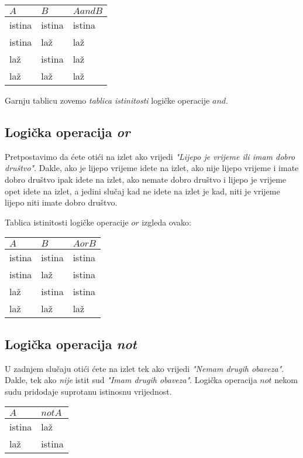 \begin{tabular}{ll|l}
	$A$ & $B$ & $A and B$ \\
	\hline
	istina & istina & istina \\
	istina & la\v{z} & la\v{z} \\
	la\v{z} & istina & la\v{z} \\
	la\v{z} & la\v{z} & la\v{z} 
\end{tabular}

Garnju tablicu zovemo \emph{tablica istinitosti} logi\v{c}ke operacije $and$.

\subsection{Logi\v{c}ka operacija \emph{or}}

Pretpostavimo da \'{c}ete oti\'{c}i na izlet ako vrijedi \emph{"Lijepo
je vrijeme ili imam dobro dru\v{s}tvo"}. Dakle, ako je lijepo vrijeme
idete na izlet, ako nije lijepo vrijeme i imate dobro dru\v{s}tvo ipak
idete na izlet, ako nemate dobro dru\v{s}tvo i lijepo je vrijeme opet
idete na izlet, a jedini slu\v{c}aj kad ne idete na izlet je kad, niti
je vrijeme lijepo niti imate dobro dru\v{s}tvo.

Tablica istinitosti logi\v{c}ke operacije $or$ izgleda ovako:

\begin{tabular}{ll|l}
	$A$ & $B$ & $A or B$ \\
	\hline
	istina & istina & istina \\
	istina & la\v{z} & istina \\
	la\v{z} & istina & istina \\
	la\v{z} & la\v{z} & la\v{z} 
\end{tabular}

\subsection{Logi\v{c}ka operacija \emph{not}}

U zadnjem slu\v{c}aju oti\'{c}i \'{c}ete na izlet tek ako vrijedi \emph{"Nemam
drugih obaveza"}. Dakle, tek ako \emph{nije} istit sud \emph{"Imam
drugih obaveza"}. Logi\v{c}ka operacija $not$ nekom sudu pridodaje
suprotanu istinosnu vrijednost.

\begin{tabular}{l|l}
	$A$ & $not A$ \\
	\hline
	istina & la\v{z}\\
	la\v{z} & istina
\end{tabular}

